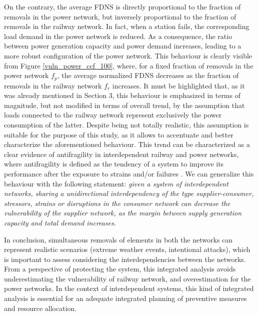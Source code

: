 \documentclass[review]{elsarticle}
\begin{document}
On the contrary, the average FDNS is directly proportional to the fraction of removals in the power network, but inversely proportional to the fraction of removals in the railway network. In fact, when a station fails, the corresponding load demand in the power network is reduced. As a consequence, the ratio between power generation capacity and power demand increases, leading to a more robust configuration of the power network. This behaviour is clearly visible from Figure \ref{vuln_power_ccf_100}, where, for a fixed fraction of removals in the power network $f_p$, the average normalized FDNS decreases as the fraction of removals in the railway network $f_r$ increases. It must be highlighted that, as it was already mentioned in Section 3, this behaviour is emphasized in terms of magnitude, but not modified in terms of  overall trend, by the assumption that loads connected to the railway network represent exclusively the power consumption of the latter. Despite being not totally realistic, this assumption is suitable for the purpose of this study, as it allows to accentuate and better characterize the aforementioned behaviour. This trend can be characterized as a clear evidence of antifragility in interdependent railway and power networks, where antifragility is defined as the tendency of a system to improve its performance after the exposure to strains and/or failures \cite{fang2017emergence}. We can generalize this behaviour with the following statement: \textit{given a system of interdependent networks, sharing a unidirectional interdependency of the type supplier-consumer, stressors, strains or disruptions in the consumer network can decrease the vulnerability of the supplier network, as the margin between supply generation capacity and total demand increases.}

In conclusion, simultaneous removals of elements in both the networks can represent realistic scenarios (extreme weather events, intentional attacks), which is important to assess considering the interdependencies between the networks. From a perspective of protecting the system, this integrated analysis avoids underestimating the vulnerability of railway network, and overestimation for the power networks. In the context of interdependent systems, this kind of integrated analysis is essential for an adequate integrated planning of preventive measures and resource allocation.
\end{document}
